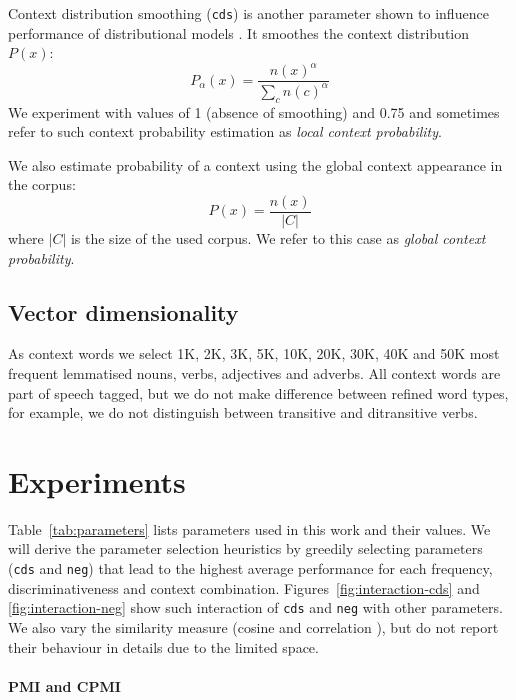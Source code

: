 \documentclass[11pt]{article}
\begin{document}
Context distribution smoothing (\texttt{cds}) is another parameter shown to influence performance of distributional models \cite{TACL570}. It smoothes the context distribution $P(x)$:
%
\begin{equation}
  \label{eq:cds}
  P_{\alpha}(x) = \frac{n(x)^{\alpha}}{\sum_{c}n(c)^{\alpha}}
\end{equation}
%
We experiment with values of 1 (absence of smoothing) and 0.75 and sometimes refer to such context probability estimation as \emph{local context probability}.

We also estimate probability of a context using the global context appearance in the corpus:
%
\begin{equation}
  \label{eq:cds-nan}
  P(x) = \frac{n(x)}{|C|}
\end{equation}
%
where $|C|$ is the size of the used corpus. We refer to this case as \emph{global context probability}.

\subsection{Vector dimensionality}
\label{sec:vect-dimens}

As context words we select 1K, 2K, 3K, 5K, 10K, 20K, 30K, 40K and 50K most frequent lemmatised nouns, verbs, adjectives and adverbs. All context words are part of speech tagged, but we do not make difference between refined word types, for example, we do not distinguish between transitive and ditransitive verbs.

\section{Experiments}
\label{sec:lexical-experiments}

Table~\ref{tab:parameters} lists parameters used in this work and their values. We will derive the parameter selection heuristics by greedily selecting parameters (\texttt{cds} and \texttt{neg}) that lead to the highest average performance for each frequency, discriminativeness and context combination. Figures~\ref{fig:interaction-cds} and \ref{fig:interaction-neg} show such interaction of \texttt{cds} and \texttt{neg} with other parameters. We also vary the similarity measure (cosine and correlation  \cite{kiela-clark:2014:CVSC}), but do not report their behaviour in details due to the limited space.

\paragraph{PMI and CPMI}
\end{document}
